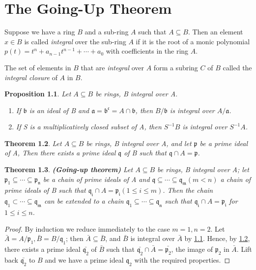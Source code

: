 \documentclass[]{report}
\newtheorem{theorem}{Theorem}[section]
\newtheorem{prop}[theorem]{Proposition}
\begin{document}
\chapter{The Going-Up Theorem}

Suppose we have a ring $B$ and a sub-ring $A$ such that $A \subseteq B$. Then an element $x \in B$ is called \textit{integral} over the sub-ring $A$ if it is the root of a monic polynomial $p(t) = t^n + a_{n-1}t^{n-1} + \cdots + a_0$ with coefficients in the ring $A$.

The set of elements in $B$ that are \textit{integral} over $A$ form a subring $C$ of $B$ called the \textit{integral closure} of $A$ in $B$.

\begin{prop}\label{5.6}
    Let $A\subseteq B$ be rings, B integral over A.
    \begin{enumerate}
        \item If $\mathfrak{b}$ is an ideal of B and $\mathfrak{a = b^c} = A \cap \mathfrak{b}$, then $B/\mathfrak{b}$ is integral over $A/\mathfrak{a}$. 
        \item If S is a multiplicatively closed subset of A, then $S^{-1}B$ is integral over $S^{-1}A$.
    \end{enumerate}
\end{prop}
    

\begin{theorem}\label{5.10}
    Let $A\subseteq B$ be rings, B integral over A, and let $\mathfrak{p}$ be a prime ideal of A, Then there exists a prime ideal $\mathfrak{q}$ of B such that $\mathfrak{q}\cap A = \mathfrak{p}$. 
\end{theorem}

\begin{theorem}
    \textbf{(Going-up theorem)} Let $A \subseteq B$ be rings, B integral over A; let $\mathfrak{p_1 \subseteq \cdots \subseteq p_n}$ be a chain of prime ideals of A and $\mathfrak{q \subseteq \cdots \subseteq q_m} (m < n )$ a chain of prime ideals of B such that $\mathfrak{q_i} \cap A = \mathfrak{p_i} (1 \leq i \leq m)$. Then the chain $\mathfrak{q_1 \subset \cdots \subseteq q_m}$ can be extended to a chain $\mathfrak{q_1 \subseteq \cdots \subseteq q_n}$ such that $\mathfrak{q_i} \cap A = \mathfrak{p_i}$ for $1 \leq i \leq n$.
\end{theorem}

\begin{proof}
By induction we reduce immediately to the case $m = 1, n = 2$. Let $\bar{A} = A/\mathfrak{p}_1, \bar{B} = B/\mathfrak{q}_1$; then $\bar{A} \subseteq \bar{B}$, and $\bar{B}$ is integral over $\bar{A}$ by \ref{5.6}. Hence, by \ref{5.10}, there exists a prime ideal $\bar{\mathfrak{q}_2}$ of $\bar{B}$ such that $\bar{\mathfrak{q}_2} \cap \bar{A} = \bar{\mathfrak{p}_2}$, the image of $\mathfrak{p}_2$ in $\bar{A}$. Lift back $\bar{\mathfrak{q}_2}$ to $B$ and we have a prime ideal $\mathfrak{q}_2$ with the required properties. 
\end{proof}
\end{document}
